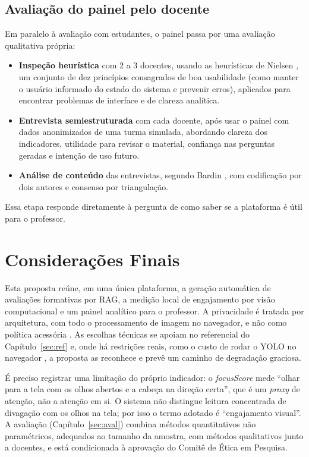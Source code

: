 \documentclass[portuguese,oneside]{tcc}
\begin{document}
\section{Avaliação do painel pelo docente}
Em paralelo à avaliação com estudantes, o painel passa por uma avaliação qualitativa própria:
\begin{itemize}
  \item \textbf{Inspeção heurística} com 2 a 3 docentes, usando as heurísticas de Nielsen \cite{Nie94}, um conjunto de dez princípios consagrados de boa usabilidade (como manter o usuário informado do estado do sistema e prevenir erros), aplicados para encontrar problemas de interface e de clareza analítica.
  \item \textbf{Entrevista semiestruturada} com cada docente, após usar o painel com dados anonimizados de uma turma simulada, abordando clareza dos indicadores, utilidade para revisar o material, confiança nas perguntas geradas e intenção de uso futuro.
  \item \textbf{Análise de conteúdo} das entrevistas, segundo Bardin \cite{Bar11}, com codificação por dois autores e consenso por triangulação.
\end{itemize}
Essa etapa responde diretamente à pergunta de como saber se a plataforma é útil para o professor.

\chapter{Considerações Finais}

Esta proposta reúne, em uma única plataforma, a geração automática de avaliações formativas por RAG, a medição local de engajamento por visão computacional e um painel analítico para o professor. A privacidade é tratada por arquitetura, com todo o processamento de imagem no navegador, e não como política acessória \cite{HBF19,UNE21}. As escolhas técnicas se apoiam no referencial do Capítulo~\ref{sec:ref} e, onde há restrições reais, como o custo de rodar o YOLO no navegador \cite{JCQ23}, a proposta as reconhece e prevê um caminho de degradação graciosa.

É preciso registrar uma limitação do próprio indicador: o \emph{focusScore} mede ``olhar para a tela com os olhos abertos e a cabeça na direção certa'', que é um \emph{proxy} de atenção, não a atenção em si. O sistema não distingue leitura concentrada de divagação com os olhos na tela; por isso o termo adotado é ``engajamento visual''. A avaliação (Capítulo~\ref{sec:aval}) combina métodos quantitativos não paramétricos, adequados ao tamanho da amostra, com métodos qualitativos junto a docentes, e está condicionada à aprovação do Comitê de Ética em Pesquisa.
\end{document}
